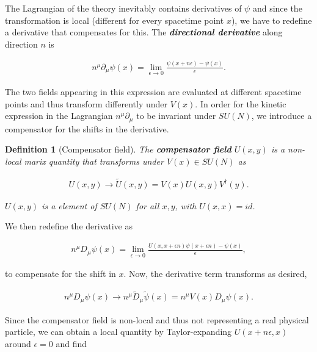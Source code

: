 \documentclass{article}
\theoremstyle{plain} %
\newtheorem{definition}{Definition}[section]
\theoremstyle{convention} %
\theoremstyle{remark} %
\def\df#1{\textbf{\textit{#1}}}
\numberwithin{equation}{section}
\begin{document}
The Lagrangian of the theory inevitably contains derivatives of $\psi$ and since the transformation is local (different for every spacetime point $x$), we have to redefine a derivative that compensates for this. The \df{directional derivative} along direction $n$ is

\begin{align}
    n^{\mu} \partial_{\mu} \psi(x) = \lim_{\epsilon \to 0} \frac{ \psi(x + n \epsilon) - \psi(x) }{\epsilon}. \label{eq:dir_derivative}
\end{align}

The two fields appearing in this expression are evaluated at different spacetime points and thus transform differently under $V(x)$. In order for the kinetic expression in the Lagrangian $n^{\mu} \partial_{\mu}$ to be invariant under $SU(N)$, we introduce a compensator for the shifts in the derivative.

\begin{definition}[Compensator field]

The \df{compensator field} $U(x,y)$ is a non-local marix quantity that transforms under $V(x) \in SU(N)$ as

\begin{align}
    U(x,y) \longrightarrow \tilde{U}(x,y) = V(x) U(x,y) V^{\dagger}(y). \label{eq:trafo_compensator}
\end{align}

$U(x,y)$ is a element of $SU(N)$ for all $x,y$, with $U(x,x) = id$.

\end{definition}

We then redefine the derivative as

\begin{align}
    n^{\mu} D_{\mu} \psi(x) = \lim_{\epsilon \to 0} \frac{ U(x,x + \epsilon n) \psi(x + \epsilon n) - \psi(x) }{\epsilon}, \label{eq:cov_derivative1}
\end{align}

to compensate for the shift in $x$. Now, the derivative term transforms as desired,

\begin{align*}
    n^{\mu} D_{\mu} \psi(x) \longrightarrow n^{\mu} \tilde{D}_{\mu} \tilde{\psi}(x) = n^{\mu} V(x) D_{\mu} \psi(x).
\end{align*}

Since the compensator field is non-local and thus not representing a real physical particle, we can obtain a local quantity by Taylor-expanding $U(x + n \epsilon, x)$ around $\epsilon = 0$ and find
\end{document}
